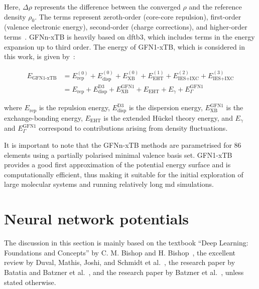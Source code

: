 Here, $\Delta \rho$ represents the difference between the converged $\rho$ and the reference density $\rho_0$. The terms represent zeroth-order (core-core repulsion), first-order (valence electronic energy), second-order (charge corrections), and higher-order terms~\citep{jensenIntroductionComputationalChemistry2017}. GFNn-xTB is heavily based on \ac{dftb}3, which includes terms in the energy expansion up to third order. The energy of GFN1-xTB, which is considered in this work, is given by~\citep{bannwarthExtendedTightbindingQuantum2021}:

\begin{equation}
    \begin{aligned}
    E_{\text{GFN1-xTB}} &= E_{\text{rep}}^{(0)} + E_{\text{disp}}^{(0)} + E_{\text{XB}}^{(0)} + E_{\text{EHT}}^{(1)} + E_{\text{IES+IXC}}^{(2)} + E_{\text{IES+IXC}}^{(3)} \\
    &= E_{\text{rep}} + E_{\text{disp}}^{\text{D3}} + E_{\text{XB}}^{\text{GFN1}} + E_{\text{EHT}} + E_{\gamma} + E_{\Gamma}^{\text{GFN1}}
    \end{aligned}
    \label{eq:gfn1xtb_energy}
\end{equation}

where $E_{\text{rep}}$ is the repulsion energy, $E_{\text{disp}}^{\text{D3}}$ is the dispersion energy, $E_{\text{XB}}^{\text{GFN1}}$ is the exchange-bonding energy, $E_{\text{EHT}}$ is the extended H\"uckel theory energy, and $E_\gamma$ and $E_\Gamma^{\text{GFN1}}$ correspond to contributions arising from density fluctuations.

It is important to note that the GFNn-xTB methods are parametrised for 86 elements using a partially polarised minimal valence basis set. GFN1-xTB provides a good first approximation of the potential energy surface and is computationally efficient, thus making it suitable for the initial exploration of large molecular systems and running relatively long \ac{md} simulations.



\section{Neural network potentials}
The discussion in this section is mainly based on the textbook ``Deep Learning: Foundations and Concepts'' by C. M. Bishop and H. Bishop~\citep{bishopDeepLearningFoundations2023}, the excellent review by Duval, Mathis, Joshi, and Schmidt et al.~\citep{duvalHitchhikersGuideGeometric2024}, the research paper by Batatia and Batzner et al.~\citep{batatiaDesignSpaceE3Equivariant2022}, and the research paper by Batzner et al.~\citep{batznerE3equivariantGraphNeural2022}, unless stated otherwise.

